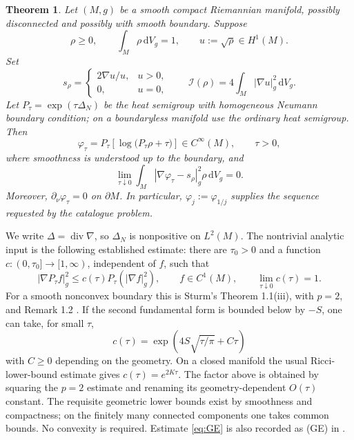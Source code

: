 \documentclass[11pt]{article}
\newtheorem{theorem}{Theorem}
\newcommand{\dd}{\,\mathrm{d}}
\newcommand{\dV}{\dd V_g}
\newcommand{\I}{\mathcal I}
\begin{document}
\begin{theorem}\label{thm:main}
Let $(M,g)$ be a smooth compact Riemannian manifold, possibly disconnected and possibly with smooth boundary. Suppose
\[
 \rho\geq0,\qquad \int_M\rho\dV=1,\qquad u:=\sqrt\rho\in H^1(M).
\]
Set
\[
 s_\rho=\begin{cases}2\nabla u/u,&u>0,\\0,&u=0,\end{cases}
 \qquad \I(\rho)=4\int_M|\nabla u|_g^2\dV.
\]
Let $P_\tau=\exp(\tau\Delta_N)$ be the heat semigroup with homogeneous Neumann boundary condition; on a boundaryless manifold use the ordinary heat semigroup. Then
\begin{equation}\label{eq:construction}
 \varphi_\tau=P_\tau\!\left[\log\big(P_\tau\rho+\tau\big)\right]
 \in C^\infty(M),\qquad \tau>0,
\end{equation}
where smoothness is understood up to the boundary, and
\begin{equation}\label{eq:conclusion}
 \lim_{\tau\downarrow0}\int_M|\nabla\varphi_\tau-s_\rho|_g^2\rho\dV=0.
\end{equation}
Moreover, $\partial_\nu\varphi_\tau=0$ on $\partial M$. In particular, $\varphi_j:=\varphi_{1/j}$ supplies the sequence requested by the catalogue problem.
\end{theorem}

We write $\Delta=\operatorname{div}\nabla$, so $\Delta_N$ is nonpositive on $L^2(M)$. The nontrivial analytic input is the following established estimate: there are $\tau_0>0$ and a function $c:(0,\tau_0]\to[1,\infty)$, independent of $f$, such that
\begin{equation}\label{eq:GE}
 |\nabla P_\tau f|_g^2\leq c(\tau)P_\tau(|\nabla f|_g^2),
 \qquad f\in C^1(M),\qquad \lim_{\tau\downarrow0}c(\tau)=1.
\end{equation}
For a smooth nonconvex boundary this is Sturm's Theorem 1.1(iii), with $p=2$, and Remark 1.2 \cite{Sturm}. If the second fundamental form is bounded below by $-S$, one can take, for small $\tau$,
\[
 c(\tau)=\exp\!\left(4S\sqrt{\tau/\pi}+C\tau\right)
\]
with $C\geq0$ depending on the geometry. On a closed manifold the usual Ricci-lower-bound estimate gives $c(\tau)=e^{2K\tau}$. The factor above is obtained by squaring the $p=2$ estimate and renaming its geometry-dependent $O(\tau)$ constant. The requisite geometric lower bounds exist by smoothness and compactness; on the finitely many connected components one takes common bounds. No convexity is required. Estimate \eqref{eq:GE} is also recorded as (GE) in \cite[Section 3]{CFM}.
\end{document}
